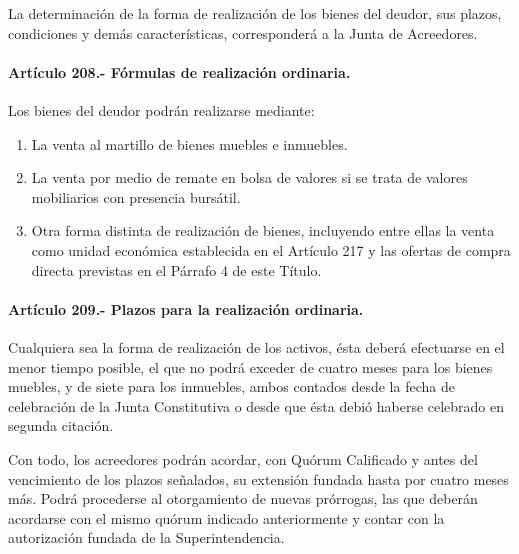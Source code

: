 \documentclass[
]{book}
\begin{document}
La determinación de la forma de realización de los bienes del deudor, sus plazos, condiciones y demás características, corresponderá a la Junta de Acreedores.

\hypertarget{artuxedculo-208.--fuxf3rmulas-de-realizaciuxf3n-ordinaria.}{%
\paragraph*{Artículo 208.- Fórmulas de realización ordinaria.}\label{artuxedculo-208.--fuxf3rmulas-de-realizaciuxf3n-ordinaria.}}

Los bienes del deudor podrán realizarse mediante:

\begin{enumerate}
\def\labelenumi{\arabic{enumi})}
\item
  La venta al martillo de bienes muebles e inmuebles.
\item
  La venta por medio de remate en bolsa de valores si se trata de valores mobiliarios con presencia bursátil.
\item
  Otra forma distinta de realización de bienes, incluyendo entre ellas la venta como unidad económica establecida en el Artículo 217 y las ofertas de compra directa previstas en el Párrafo 4 de este Título.
\end{enumerate}

\hypertarget{artuxedculo-209.--plazos-para-la-realizaciuxf3n-ordinaria.}{%
\paragraph*{Artículo 209.- Plazos para la realización ordinaria.}\label{artuxedculo-209.--plazos-para-la-realizaciuxf3n-ordinaria.}}

Cualquiera sea la forma de realización de los activos, ésta deberá efectuarse en el menor tiempo posible, el que no podrá exceder de cuatro meses para los bienes muebles, y de siete para los inmuebles, ambos contados desde la fecha de celebración de la Junta Constitutiva o desde que ésta debió haberse celebrado en segunda citación.

Con todo, los acreedores podrán acordar, con Quórum Calificado y antes del vencimiento de los plazos señalados, su extensión fundada hasta por cuatro meses más. Podrá procederse al otorgamiento de nuevas prórrogas, las que deberán acordarse con el mismo quórum indicado anteriormente y contar con la autorización fundada de la Superintendencia.
\end{document}
